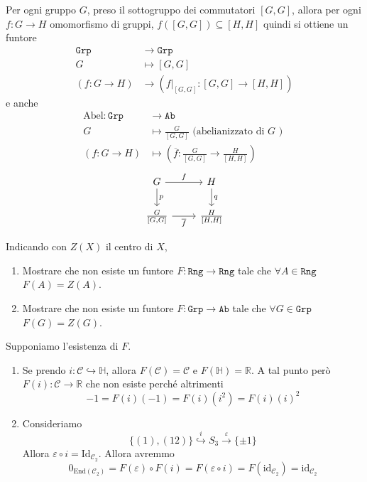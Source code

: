 \begin{example}{}
    Per ogni gruppo \(G\), preso il sottogruppo dei commutatori \([G, G]\),
    allora per ogni \(f : G \to H\) omomorfismo di gruppi, \(f{([G, G])} \subseteq [H, H] \) 
    quindi si ottiene un funtore
    \begin{align*}{}
        \mathtt{Grp} &\to \mathtt{Grp} \\
        G &\mapsto [G, G] \\
        {(f : G \to H)} &\to {(f |_{[G, G]} : [G, G] \to [H, H] )}
    \end{align*}
    e anche 
    \begin{align*}
        \mathrm{Abel} : \mathtt{Grp} &\to \mathtt{Ab} \\
        G &\mapsto \frac{G}{[G, G]} \text{ (abelianizzato di \(G\) ) } \\
        {(f : G \to H)} &\mapsto {\left(\overline{f} : \frac{G}{[G,G]} \to \frac{H}{[H,H]}\right)}
    \end{align*}
\[\begin{tikzcd}
	{G} & {H} \\
    {\frac{G}{[G,G]}} & {\frac{H}{[H,H]}}
	\arrow["f", from=1-1, to=1-2]
	\arrow["{p}", from=1-1, to=2-1]
	\arrow["{q}", from=1-2, to=2-2]
	\arrow["\overline{f}"', from=2-1, to=2-2]
\end{tikzcd}\]
\end{example}

\begin{eser}{}
    Indicando con \(Z{(X)}\) il centro di \(X\),

\begin{enumerate}[label = \alph*.]
    \item Mostrare che non esiste un funtore \(F : \mathtt{Rng} \to \mathtt{Rng}\) tale
    che \(\forall A \in \mathtt{Rng}\) \(F{(A)} = Z{(A)}\).
    \item Mostrare che non esiste un funtore \(F : \mathtt{Grp} \to \mathtt{Ab}\) tale
    che \(\forall G \in \mathtt{Grp}\) \(F{(G)} = Z{(G)}\).
\end{enumerate}
    \tcblower
    Supponiamo l'esistenza di \(F\).
\begin{enumerate}[label = \alph*.]
    \item Se prendo \(i : \mathbb{\mathcal{C}} \hookrightarrow \mathbb{H}\),
        allora \(F{(\mathbb{\mathcal{C}})} = \mathbb{\mathcal{C}} \) e \(F{(\mathbb{H})} = \mathbb{R}\). A tal punto però \(
        F{(i)} : \mathbb{\mathcal{C}} \to \mathbb{R}\) che non esiste perché altrimenti \[-1 = F{(i)}{(-1)} = F{(i)}{(i^2)} = F{(i)}{(i)}^2\]
    \item Consideriamo
        \[
          \{(1), (12)\} \overset{i}{\hookrightarrow } S_{3} \overset{\varepsilon}{\to } \{\pm 1\} 
        \]
        Allora \(\varepsilon \circ i = \mathrm{Id}_{\mathcal{C}_{2}} \). Allora avremmo
        \[
          0_{\mathrm{End}{(\mathcal{C}_{2})}}  = F{(\varepsilon)} \circ F{(i)} = F{(\varepsilon \circ i)} = F{(\mathrm{id}_{\mathcal{C}_{2}})} = \mathrm{id}_{\mathcal{C}_{2}}
        \]
\end{enumerate}

\end{eser}

